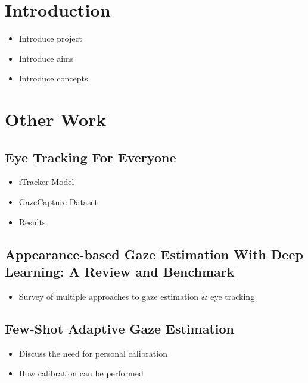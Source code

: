\documentclass[twocolumn]{report}
\begin{document}
\tableofcontents

\chapter{Introduction}


\begin{itemize}
    \item Introduce project
    \item Introduce aims 
    \item Introduce concepts 
\end{itemize}

\chapter{Other Work}

\section{Eye Tracking For Everyone}

\begin{itemize}
    \item iTracker Model 
    \item GazeCapture Dataset 
    \item Results 
\end{itemize}

\section{Appearance-based Gaze Estimation With Deep Learning: A Review and Benchmark}

\begin{itemize}
    \item Survey of multiple approaches to gaze estimation \& eye tracking 
\end{itemize}



\section{Few-Shot Adaptive Gaze Estimation}

\begin{itemize}
    \item Discuss the need for personal calibration 
    \item How calibration can be performed 
\end{itemize}
\end{document}
